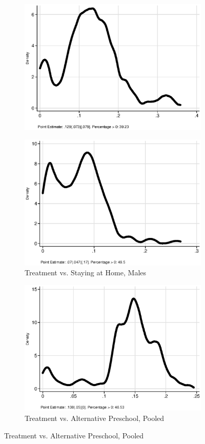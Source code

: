 \begin{figure}
\begin{subfigure}[h]{0.25\textwidth}
		\includegraphics[width=\textwidth]{output/irr_5_sexf.eps}
\end{subfigure}%
\begin{subfigure}[h]{0.25\textwidth}
	\centering
	\caption{Treatment vs. Staying at Home, Males}
		\includegraphics[width=\textwidth]{output/irr_5_sexm.eps}
\end{subfigure}
\begin{subfigure}[h]{0.25\textwidth}
	\centering
	\caption{Treatment vs. Alternative Preschool, Pooled}
		\includegraphics[width=\textwidth]{output/irr_8_sexp.eps}

\end{subfigure}
\end{figure}
